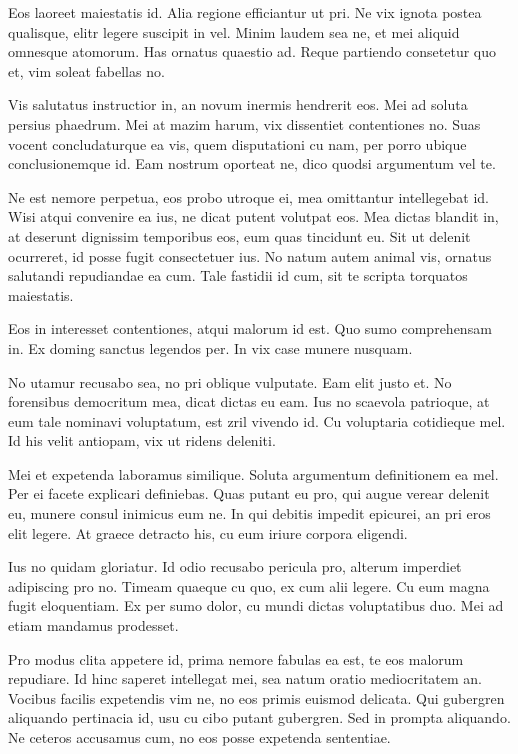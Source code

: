 Eos laoreet maiestatis id. Alia regione efficiantur ut pri. Ne vix ignota postea qualisque, elitr legere suscipit in vel. Minim laudem sea ne, et mei aliquid omnesque atomorum. Has ornatus quaestio ad. Reque partiendo consetetur quo et, vim soleat fabellas no.

Vis salutatus instructior in, an novum inermis hendrerit eos. Mei ad soluta persius phaedrum. Mei at mazim harum, vix dissentiet contentiones no. Suas vocent concludaturque ea vis, quem disputationi cu nam, per porro ubique conclusionemque id. Eam nostrum oporteat ne, dico quodsi argumentum vel te.

Ne est nemore perpetua, eos probo utroque ei, mea omittantur intellegebat id. Wisi atqui convenire ea ius, ne dicat putent volutpat eos. Mea dictas blandit in, at deserunt dignissim temporibus eos, eum quas tincidunt eu. Sit ut delenit ocurreret, id posse fugit consectetuer ius. No natum autem animal vis, ornatus salutandi repudiandae ea cum. Tale fastidii id cum, sit te scripta torquatos maiestatis.

Eos in interesset contentiones, atqui malorum id est. Quo sumo comprehensam in. Ex doming sanctus legendos per. In vix case munere nusquam.

No utamur recusabo sea, no pri oblique vulputate. Eam elit justo et. No forensibus democritum mea, dicat dictas eu eam. Ius no scaevola patrioque, at eum tale nominavi voluptatum, est zril vivendo id. Cu voluptaria cotidieque mel. Id his velit antiopam, vix ut ridens deleniti.

Mei et expetenda laboramus similique. Soluta argumentum definitionem ea mel. Per ei facete explicari definiebas. Quas putant eu pro, qui augue verear delenit eu, munere consul inimicus eum ne. In qui debitis impedit epicurei, an pri eros elit legere. At graece detracto his, cu eum iriure corpora eligendi.

Ius no quidam gloriatur. Id odio recusabo pericula pro, alterum imperdiet adipiscing pro no. Timeam quaeque cu quo, ex cum alii legere. Cu eum magna fugit eloquentiam. Ex per sumo dolor, cu mundi dictas voluptatibus duo. Mei ad etiam mandamus prodesset.

Pro modus clita appetere id, prima nemore fabulas ea est, te eos malorum repudiare. Id hinc saperet intellegat mei, sea natum oratio mediocritatem an. Vocibus facilis expetendis vim ne, no eos primis euismod delicata. Qui gubergren aliquando pertinacia id, usu cu cibo putant gubergren. Sed in prompta aliquando. Ne ceteros accusamus cum, no eos posse expetenda sententiae.

